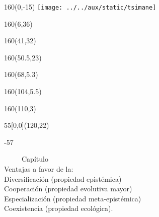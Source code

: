 \documentclass[shownotes,aspectratio=169]{beamer}
\newcounter{capitulo}
\newcommand{\unidad}{\thecapitulo \stepcounter{capitulo}}
\begin{document}
\begin{frame}

\begin{textblock}{160}(0,-15)
\texttt{[image: ../../aux/static/tsimane]}
\end{textblock}


\begin{textblock}{160}(6,36)
\LARGE {}
\end{textblock}
\begin{textblock}{160}(41,32)
\LARGE {}
\end{textblock}
\begin{textblock}{160}(50.5,23)
\LARGE {}
\end{textblock}
\begin{textblock}{160}(68,5.3)
\LARGE {}
\end{textblock}
\begin{textblock}{160}(104,5.5)
\LARGE {}
\end{textblock}
\begin{textblock}{160}(110,3)
\LARGE {}
\end{textblock}


\begin{textblock}{55}[0,0](120,22)
\begin{turn}{-57}
\parbox{7cm}{\sloppy\setlength\parfillskip{0pt}
\textcolor{black!0}{\ \ \ \ \ Capítulo \unidad} \\
\small\textcolor{black!5}{\hspace{-0.15cm} Ventajas a favor de la:} \\
\small\textcolor{black!5}{\hspace{-1.45cm} Diversificación (propiedad epistémica)}\\
\small\textcolor{black!5}{\hspace{-1.7cm} Cooperación (propiedad evolutiva mayor)}\\
\small\textcolor{black!5}{ \hspace{-1.75cm}Especialización (propiedad meta-epistémica)} \\
\small\textcolor{black!5}{\hspace{-2cm} Coexistencia (propiedad ecológica).\\ }}
\end{turn}
\end{textblock}


\end{frame}
\end{document}
